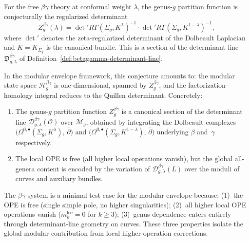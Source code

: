 \begin{conjecture}
\label{conj:betagamma-modular-state-spaces}
\ClaimStatusConjectured
For the free $\beta\gamma$ theory at conformal weight $\lambda$, the
genus-$g$ partition function is conjecturally the regularized determinant
\begin{equation}\label{eq:betagamma-partition-determinant}
Z_g^{\beta\gamma}(\lambda)
= \det\nolimits' R\Gamma(\Sigma_g, K^{\lambda})^{-1}
 \cdot \det\nolimits' R\Gamma(\Sigma_g, K^{1-\lambda})^{-1},
\end{equation}
where $\det'$ denotes the zeta-regularized determinant of the Dolbeault
Laplacian and $K = K_{\Sigma_g}$ is the canonical bundle. This is a
section of the determinant line
$\mathfrak{D}^{\beta\gamma}_{g,\lambda}$ of
Definition~\textup{\ref{def:betagamma-determinant-line}}.

In the modular envelope framework, this conjecture amounts to: the
modular state space $\mathcal{H}_g^{\beta\gamma}$ is one-dimensional,
spanned by $Z_g^{\beta\gamma}$, and the factorization-homology integral
reduces to the Quillen determinant. Concretely:
\begin{enumerate}
\item The genus-$g$ partition function $Z_g^{\beta\gamma}$ is a canonical
 section of the determinant line
 $\mathcal{D}^{\beta\gamma}_{g,\lambda}(\mathcal{O})$ over $\mathcal{M}_g$,
 obtained by integrating the Dolbeault complexes
 $\bigl(\Omega^{0,\bullet}(\Sigma_g, K^{\lambda}),\, \overline{\partial}\bigr)$
 and
 $\bigl(\Omega^{0,\bullet}(\Sigma_g, K^{1-\lambda}),\, \overline{\partial}\bigr)$
 underlying $\beta$ and~$\gamma$ respectively.
\item The local OPE is free (all higher local operations vanish), but the
 global all-genera content is encoded by the variation of
 $\mathcal{D}^{\beta\gamma}_{g,\lambda}(L)$ over the moduli of curves
 and auxiliary bundles.
\end{enumerate}
\end{conjecture}

\begin{remark}
\label{rem:betagamma-cleanest-test}
The $\beta\gamma$ system is a minimal test case for the modular envelope because:
(1)~the OPE is free (single simple pole, no higher singularities);
(2)~all higher local OPE operations vanish
($m_k^{\mathrm{loc}} = 0$ for $k \ge 3$);
(3)~genus dependence enters entirely through determinant-line geometry on curves.
These three properties isolate the global modular contribution from local higher-operation corrections.
\end{remark}


